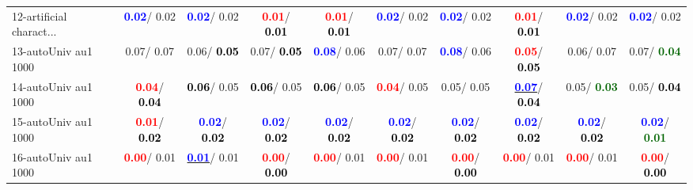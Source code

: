 \begin{table}[h]
\begin{center}
{\begin{tabular}{lc|c|c|c|c|c|c|c|c}
12-artificial charact... & \textcolor{blue}{\textbf{  0.02}}/  0.02 & \textcolor{blue}{\textbf{  0.02}}/  0.02 & \textcolor{red}{\textbf{  0.01}}/\textcolor{black}{\textbf{  0.01}} & \textcolor{red}{\textbf{  0.01}}/\textcolor{black}{\textbf{  0.01}} & \textcolor{blue}{\textbf{  0.02}}/  0.02 & \textcolor{blue}{\textbf{  0.02}}/  0.02 & \textcolor{red}{\textbf{  0.01}}/\textcolor{black}{\textbf{  0.01}} & \textcolor{blue}{\textbf{  0.02}}/  0.02 & \textcolor{blue}{\textbf{  0.02}}/  0.02 \\
13-autoUniv au1 1000 &   0.07/  0.07 &   0.06/\textcolor{black}{\textbf{  0.05}} &   0.07/\textcolor{black}{\textbf{  0.05}} & \textcolor{blue}{\textbf{  0.08}}/  0.06 &   0.07/  0.07 & \textcolor{blue}{\textbf{  0.08}}/  0.06 & \textcolor{red}{\textbf{  0.05}}/\textcolor{black}{\textbf{  0.05}} &   0.06/  0.07 &   0.07/\textcolor{darkgreen}{\textbf{  0.04}} \\
14-autoUniv au1 1000 & \textcolor{red}{\textbf{  0.04}}/\textcolor{black}{\textbf{  0.04}} & \textcolor{black}{\textbf{  0.06}}/  0.05 & \textcolor{black}{\textbf{  0.06}}/  0.05 & \textcolor{black}{\textbf{  0.06}}/  0.05 & \textcolor{red}{\textbf{  0.04}}/  0.05 &   0.05/  0.05 & \underline{\textcolor{blue}{\textbf{  0.07}}}/\textcolor{black}{\textbf{  0.04}} &   0.05/\textcolor{darkgreen}{\textbf{  0.03}} &   0.05/\textcolor{black}{\textbf{  0.04}} \\ \hline
15-autoUniv au1 1000 & \textcolor{red}{\textbf{  0.01}}/\textcolor{black}{\textbf{  0.02}} & \textcolor{blue}{\textbf{  0.02}}/\textcolor{black}{\textbf{  0.02}} & \textcolor{blue}{\textbf{  0.02}}/\textcolor{black}{\textbf{  0.02}} & \textcolor{blue}{\textbf{  0.02}}/\textcolor{black}{\textbf{  0.02}} & \textcolor{blue}{\textbf{  0.02}}/\textcolor{black}{\textbf{  0.02}} & \textcolor{blue}{\textbf{  0.02}}/\textcolor{black}{\textbf{  0.02}} & \textcolor{blue}{\textbf{  0.02}}/\textcolor{black}{\textbf{  0.02}} & \textcolor{blue}{\textbf{  0.02}}/\textcolor{black}{\textbf{  0.02}} & \textcolor{blue}{\textbf{  0.02}}/\textcolor{darkgreen}{\textbf{  0.01}} \\
16-autoUniv au1 1000 & \textcolor{red}{\textbf{  0.00}}/  0.01 & \underline{\textcolor{blue}{\textbf{  0.01}}}/  0.01 & \textcolor{red}{\textbf{  0.00}}/\textcolor{black}{\textbf{  0.00}} & \textcolor{red}{\textbf{  0.00}}/  0.01 & \textcolor{red}{\textbf{  0.00}}/  0.01 & \textcolor{red}{\textbf{  0.00}}/\textcolor{black}{\textbf{  0.00}} & \textcolor{red}{\textbf{  0.00}}/  0.01 & \textcolor{red}{\textbf{  0.00}}/  0.01 & \textcolor{red}{\textbf{  0.00}}/\textcolor{black}{\textbf{  0.00}} \\

\end{tabular}}
\end{center}
\end{table}
